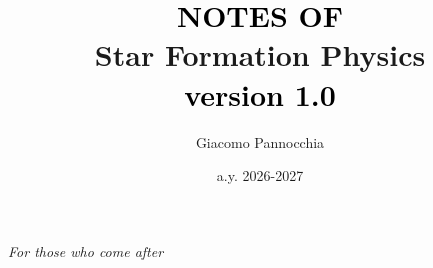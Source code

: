 \documentclass[a4paper,twoside,openright,titlepage,
               headinclude,footinclude,BCOR5mm,
               numbers=noenddot,cleardoublepage=empty,
               tablecaptionabove]{scrbook}
\author{Giacomo Pannocchia}
\title{\textcolor{black}{NOTES OF}\\ \textcolor{RawSienna}{Star Formation Physics} \\ \vspace{7pt}\large \quad \quad \quad \quad \quad \textcolor{black}{version 1.0}}
\date{a.y. 2026-2027}
\begin{document}
  \begin{titlepage}
    \maketitle
  \end{titlepage}

\cleardoublepage
\newpage

\pagestyle{empty}

\thispagestyle{empty}
    \null{}
        \begin{flushright}
          \Large
                \emph{For those who come after}
        
        \end{flushright}
\null

\cleardoublepage
\newpage

\pagestyle{empty}
\setcounter{page}{1}

% 



\cleardoublepage
\newpage

\tableofcontents
\cleardoublepage
\newpage

\mainmatter
\pagestyle{scrheadings}

\setcounter{page}{1}








\cleardoublepage
{}


\cleardoublepage
{}
{}
\small


\end{document}
